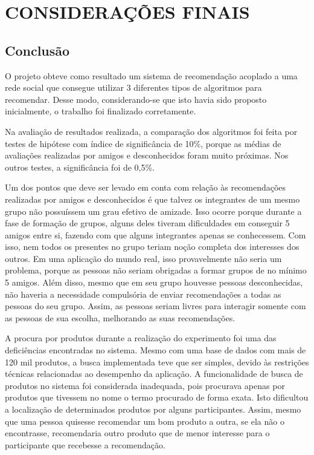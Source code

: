 \chapter{CONSIDERAÇÕES FINAIS} %
\label{cha:consideracoes_finais}

\section{Conclusão}
\label{conclusao}

 O projeto obteve como resultado um sistema de recomendação acoplado a uma rede social que consegue utilizar 3 diferentes tipos de algoritmos para recomendar. Desse modo, considerando-se que isto havia sido proposto inicialmente, o trabalho foi finalizado corretamente.

 Na avaliação de resultados realizada, a comparação dos algoritmos foi feita por testes de hipótese com índice de significância de 10\%, porque as médias de avaliações realizadas por amigos e desconhecidos foram muito próximas. Nos outros testes, a significância foi de 0,5\%.

  Um dos pontos que deve ser levado em conta com relação às recomendações realizadas por amigos e desconhecidos é que talvez os integrantes de um mesmo grupo não possuíssem um grau efetivo de amizade. Isso ocorre porque durante a fase de formação de grupos, alguns deles tiveram dificuldades em conseguir 5 amigos entre si, fazendo com que alguns integrantes apenas se conhecessem. Com isso, nem todos os presentes no grupo teriam noção completa dos interesses dos outros. Em uma aplicação do mundo real, isso provavelmente não seria um problema, porque as pessoas não seriam obrigadas a formar grupos de no mínimo 5 amigos. Além disso, mesmo que em seu grupo houvesse pessoas desconhecidas, não haveria a necessidade compulsória de enviar recomendações a todas as pessoas do seu grupo. Assim, as pessoas seriam livres para interagir somente com as pessoas de sua escolha, melhorando as suas recomendações.

  A procura por produtos durante a realização do experimento foi uma das deficiências encontradas no sistema. Mesmo com uma base de dados com mais de 120 mil produtos, a busca implementada teve que ser simples, devido às restrições técnicas relacionadas ao desempenho da aplicação. A funcionalidade de busca de produtos no sistema foi considerada inadequada, pois procurava apenas por produtos que tivessem no nome o termo procurado de forma exata. Isto dificultou a localização de determinados produtos por alguns participantes. Assim, mesmo que uma pessoa quisesse recomendar um bom produto a outra, se ela não o encontrasse, recomendaria outro produto que de menor interesse para o participante que recebesse a recomendação.

